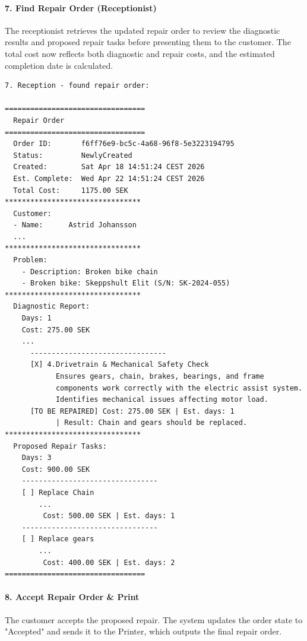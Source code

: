 \documentclass[a4paper]{scrartcl}
\begin{document}
\paragraph{7. Find Repair Order (Receptionist)} 
The receptionist retrieves the updated repair order to review the diagnostic results and proposed repair tasks before presenting them to the customer. The total cost now reflects both diagnostic and repair costs, and the estimated completion date is calculated.

\begin{lstlisting}[style=outputstyle, caption={Printout from find repair order system operation}, label={fig:run-find-repair-order}]
7. Reception - found repair order:

=================================
  Repair Order
=================================
  Order ID:       f6ff76e9-bc5c-4a68-96f8-5e3223194795
  Status:         NewlyCreated
  Created:        Sat Apr 18 14:51:24 CEST 2026
  Est. Complete:  Wed Apr 22 14:51:24 CEST 2026
  Total Cost:     1175.00 SEK
********************************
  Customer:
  - Name:      Astrid Johansson
  ...
********************************
  Problem:
    - Description: Broken bike chain
    - Broken bike: Skeppshult Elit (S/N: SK-2024-055)
********************************
  Diagnostic Report:
    Days: 1
    Cost: 275.00 SEK
    ...
      --------------------------------
      [X] 4.Drivetrain & Mechanical Safety Check
            Ensures gears, chain, brakes, bearings, and frame
            components work correctly with the electric assist system.
            Identifies mechanical issues affecting motor load.
      [TO BE REPAIRED] Cost: 275.00 SEK | Est. days: 1
            | Result: Chain and gears should be replaced.
********************************
  Proposed Repair Tasks:
    Days: 3
    Cost: 900.00 SEK
    --------------------------------
    [ ] Replace Chain
        ...
         Cost: 500.00 SEK | Est. days: 1
    --------------------------------
    [ ] Replace gears
        ...
         Cost: 400.00 SEK | Est. days: 2
=================================
\end{lstlisting}

\paragraph{8. Accept Repair Order \& Print} 
The customer accepts the proposed repair. The system updates the order state to "Accepted" and sends it to the Printer, which outputs the final repair order.
\end{document}
